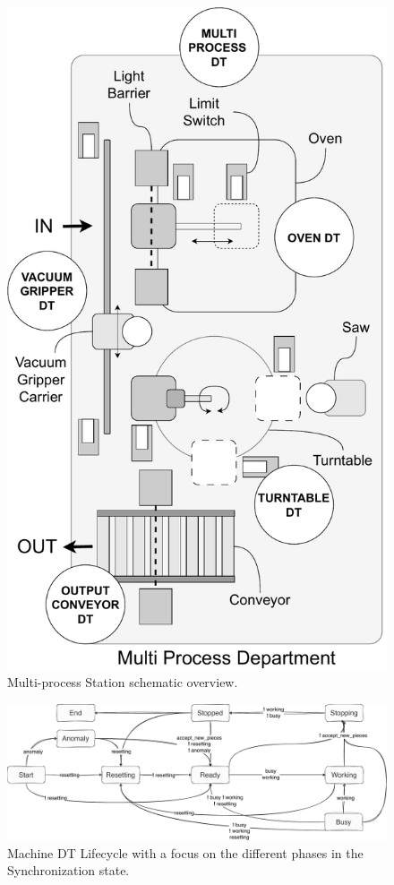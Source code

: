 \begin{figure}[t]
    \setlength{\belowcaptionskip}{-13pt}
    \centering
    \includegraphics[width=0.9\columnwidth]{figures/dt-lifecycle/multiprocess-station-shcematic-overview.pdf}
    \caption{Multi-process Station schematic overview.}
    \label{fig:multiprocess-station-schematic-overview}
\end{figure}

\begin{figure}
    \setlength{\belowcaptionskip}{-13pt}
    \centering
    \includegraphics[width=\textwidth]{figures/dt-lifecycle/graph_machine_logic.pdf}
    \caption{Machine DT Lifecycle with a focus on the different phases in the Synchronization state.}
    \label{fig:graph-machine-logic}
\end{figure}

